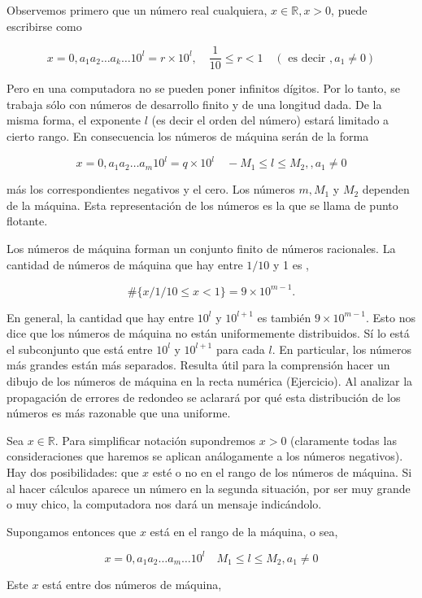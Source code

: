 \documentclass[10pt]{book}
\begin{document}
Observemos primero que un número real cualquiera, $x \in \mathbb{R}, x>0$, puede escribirse como

$$
x=0, a_{1} a_{2} \ldots a_{k} \ldots 10^{l}=r \times 10^{l}, \quad \frac{1}{10} \leq r<1 \quad\left(\text { es decir }, a_{1} \neq 0\right)
$$

Pero en una computadora no se pueden poner infinitos dígitos. Por lo tanto, se trabaja sólo con números de desarrollo finito y de una longitud dada. De la misma forma, el exponente $l$ (es decir el orden del número) estará limitado a cierto rango. En consecuencia los números de máquina serán de la forma

$$
x=0, a_{1} a_{2} \ldots a_{m} 10^{l}=q \times 10^{l} \quad-M_{1} \leq l \leq M_{2},, a_{1} \neq 0
$$

más los correspondientes negativos y el cero. Los números $m, M_{1}$ y $M_{2}$ dependen de la máquina. Esta representación de los números es la que se llama de punto flotante.

Los números de máquina forman un conjunto finito de números racionales. La cantidad de números de máquina que hay entre $1 / 10$ y 1 es ,

$$
\#\{x / 1 / 10 \leq x<1\}=9 \times 10^{m-1} .
$$

En general, la cantidad que hay entre $10^{l}$ y $10^{l+1}$ es también $9 \times 10^{m-1}$. Esto nos dice que los números de máquina no están uniformemente distribuidos. Sí lo está el subconjunto que está entre $10^{l}$ y $10^{l+1}$ para cada $l$. En particular, los números más grandes están más separados. Resulta útil para la comprensión hacer un dibujo de los números de máquina en la recta numérica (Ejercicio). Al analizar la propagación de errores de redondeo se aclarará por qué esta distribución de los números es más razonable que una uniforme.

Sea $x \in \mathbb{R}$. Para simplificar notación supondremos $x>0$ (claramente todas las consideraciones que haremos se aplican análogamente a los números negativos). Hay dos posibilidades: que $x$ esté o no en el rango de los números de máquina. Si al hacer cálculos aparece un número en la segunda situación, por ser muy grande o muy chico, la computadora nos dará un mensaje indicándolo.

Supongamos entonces que $x$ está en el rango de la máquina, o sea,

$$
x=0, a_{1} a_{2} \ldots a_{m} \ldots 10^{l} \quad M_{1} \leq l \leq M_{2}, a_{1} \neq 0
$$

Este $x$ está entre dos números de máquina,
\end{document}
